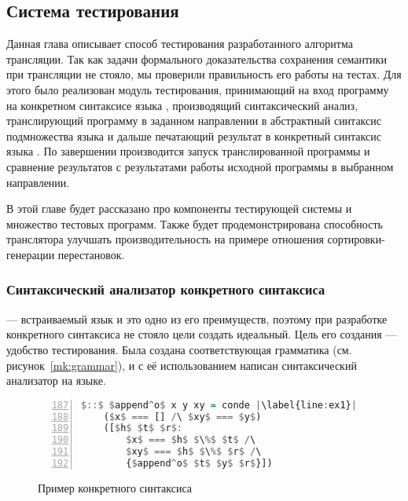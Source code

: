 \subsection{Система тестирования}

Данная глава описывает способ тестирования разработанного алгоритма трансляции.
Так как задачи формального доказательства сохранения семантики при трансляции не стояло, мы проверили правильность его работы на тестах.
Для этого было реализован модуль тестирования, принимающий на вход программу на конкретном синтаксисе языка \miniKanren{}, производящий синтаксический анализ, транслирующий программу в заданном направлении в абстрактный синтаксис подмножества языка \haskell{} и дальше печатающий результат в конкретный синтаксис языка \haskell{}.
По завершении производится запуск транслированной программы и сравнение результатов с результатами работы исходной программы \miniKanren{} в выбранном направлении.

В этой главе будет рассказано про компоненты тестирующей системы и множество тестовых программ.
Также будет продемонстрирована способность транслятора улучшать производительность на примере отношения сортировки-генерации перестановок.


\subsubsection{Синтаксический анализатор конкретного синтаксиса \miniKanren{}}

\miniKanren{} --- встраиваемый язык и это одно из его преимуществ, поэтому при разработке конкретного синтаксиса не стояло цели создать идеальный.
Цель его создания --- удобство тестирования.
Была создана соответствующая грамматика (см. рисунок~\ref{mk:grammar}), и с её использованием написан синтаксический анализатор на языке.

\begin{figure}[h!]
  \begin{center}
  \begin{minipage}{0.35\textwidth}
  \begin{lstlisting}[language=Haskell, frame=single, numbers=left,numberstyle=\small, firstnumber=187, escapechar=|]
  $::$ $append^o$ x y xy = conde |\label{line:ex1}|
    ($x$ === [] /\ $xy$ === $y$)
    ([$h$ $t$ $r$:
        $x$ === $h$ $\%$ $t$ /\
        $xy$ === $h$ $\%$ $r$ /\
        {$append^o$ $t$ $y$ $r$}])
  \end{lstlisting}
  \end{minipage}
  \end{center}
  \caption{Пример конкретного синтаксиса \miniKanren{}}
  \label{lst:ex}
\end{figure}

